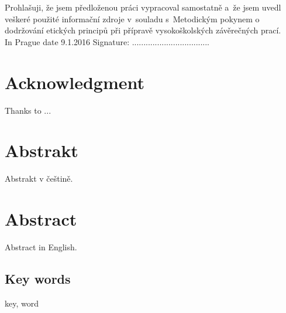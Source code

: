 \documentclass[a4paper, twoside, 12pt]{report}
\begin{document}
Prohlašuji, že jsem předloženou práci vypracoval samostatně a~že jsem uvedl veškeré použité informační zdroje v~souladu s~Metodickým pokynem o dodržování etických principů při přípravě vysokoškolských závěrečných prací.\vspace{1cm}
\\In Prague date 9.1.2016 \hfill
Signature: ..................................

\newpage
\null\thispagestyle{empty}


\newpage
\chapter*{Acknowledgment}
\thispagestyle{empty}
\vspace{20px}
Thanks to ...

\thispagestyle{empty}

\newpage
\null\thispagestyle{empty}


\newpage
\chapter*{Abstrakt}
\thispagestyle{empty}
Abstrakt v češtině.

\begingroup
\vspace{25px}
\let\clearpage\relax
\chapter*{Abstract}
\thispagestyle{empty}

Abstract in English.


\section*{Key words}
key, word
\endgroup

\newpage\null\thispagestyle{empty}


\end{document}
